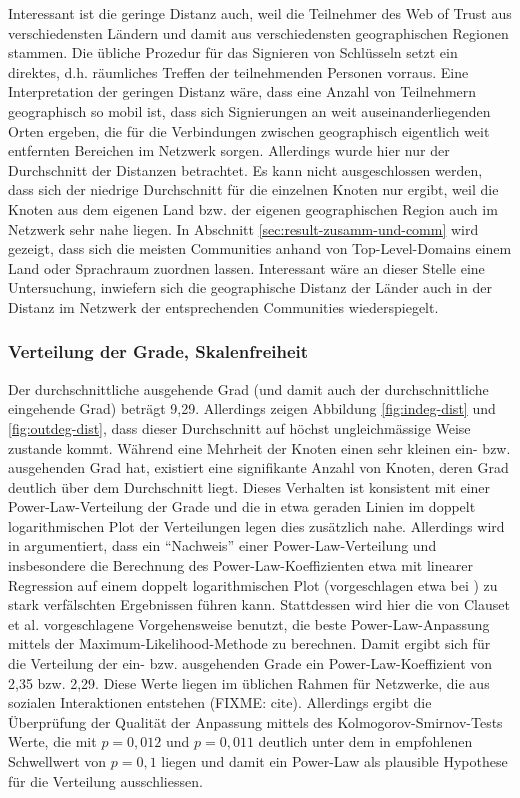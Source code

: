 Interessant ist die geringe Distanz auch, weil die Teilnehmer des Web
of Trust aus verschiedensten L\"andern und damit aus verschiedensten
geographischen Regionen stammen. Die \"ubliche Prozedur f\"ur das
Signieren von Schl\"usseln setzt ein direktes, d.h. r\"aumliches
Treffen der teilnehmenden Personen vorraus. Eine Interpretation der
geringen Distanz w\"are, dass eine Anzahl von Teilnehmern geographisch
so mobil ist, dass sich Signierungen an weit auseinanderliegenden
Orten ergeben, die f\"ur die Verbindungen zwischen geographisch
eigentlich weit entfernten Bereichen im Netzwerk sorgen. Allerdings
wurde hier nur der Durchschnitt der Distanzen betrachtet. Es kann
nicht ausgeschlossen werden, dass sich der niedrige Durchschnitt f\"ur
die einzelnen Knoten nur ergibt, weil die Knoten aus dem eigenen Land
bzw. der eigenen geographischen Region auch im Netzwerk sehr nahe
liegen. In Abschnitt \ref{sec:result-zusamm-und-comm} wird gezeigt,
dass sich die meisten Communities anhand von Top-Level-Domains einem
Land oder Sprachraum zuordnen lassen. Interessant w\"are an dieser
Stelle eine Untersuchung, inwiefern sich die geographische Distanz der
L\"ander auch in der Distanz im Netzwerk der entsprechenden
Communities wiederspiegelt.

\subsubsection{Verteilung der Grade, Skalenfreiheit}
\label{sec:verteilung-der-grade}

Der durchschnittliche ausgehende Grad (und damit auch der
durchschnittliche eingehende Grad) betr\"agt 9,29. Allerdings zeigen
Abbildung \ref{fig:indeg-dist} und \ref{fig:outdeg-dist}, dass dieser
Durchschnitt auf h\"ochst ungleichm\"assige Weise zustande
kommt. W\"ahrend eine Mehrheit der Knoten einen sehr kleinen ein-
bzw. ausgehenden Grad hat, existiert eine signifikante Anzahl von
Knoten, deren Grad deutlich \"uber dem Durchschnitt liegt. Dieses
Verhalten ist konsistent mit einer Power-Law-Verteilung der Grade und
die in etwa geraden Linien im doppelt logarithmischen Plot der
Verteilungen legen dies zus\"atzlich nahe. Allerdings wird in
\cite{Clauset2009} argumentiert, dass ein ``Nachweis'' einer
Power-Law-Verteilung und insbesondere die Berechnung des
Power-Law-Koeffizienten etwa mit linearer Regression auf einem doppelt
logarithmischen Plot (vorgeschlagen etwa bei \cite{Brinkmeier2004}) zu
stark verf\"alschten Ergebnissen f\"uhren kann. Stattdessen wird hier
die von Clauset et al. vorgeschlagene Vorgehensweise benutzt, die
beste Power-Law-Anpassung mittels der Maximum-Likelihood-Methode zu
berechnen. Damit ergibt sich f\"ur die Verteilung der ein-
bzw. ausgehenden Grade ein Power-Law-Koeffizient von 2,35
bzw. 2,29. Diese Werte liegen im \"ublichen Rahmen f\"ur Netzwerke,
die aus sozialen Interaktionen entstehen (FIXME: cite). Allerdings
ergibt die \"Uberpr\"ufung der Qualit\"at der Anpassung mittels des
Kolmogorov-Smirnov-Tests Werte, die mit $p = 0,012$ und $p = 0,011$
deutlich unter dem in \cite{Clauset2009} empfohlenen Schwellwert von
$p=0,1$ liegen und damit ein Power-Law als plausible Hypothese f\"ur
die Verteilung ausschliessen.

